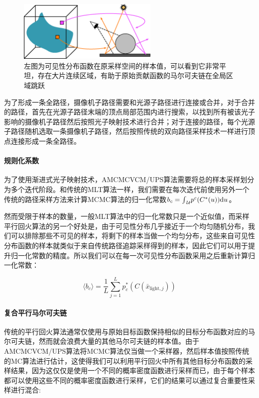 \begin{figure}
\sidecaption
\includegraphics[width=0.6\textwidth]{figures/mlt/visibility-contribution}
\caption{左图为可见性分布函数在原采样空间的样本值，可以看到它非常平坦，存在大片连续区域，有助于原始贡献函数的马尔可夫链在全局区域跳跃}
\label{f:mlt-visibility-contribution}
\end{figure}

为了形成一条全路径，摄像机子路径需要和光源子路径进行连接或合并，对于合并的路径，首先在光源子路径末端的顶点局部范围内进行搜索，以找到所有被该光子影响的摄像机子路径然后按照光子映射技术进行合并；对于连接的路径，每个光源子路径随机选取一条摄像机子路径，然后按照传统的双向路径采样技术一样进行顶点连接形成一条全路径。




\paragraph{规则化系数}
为了使用渐进式光子映射技术，AMCMCVCM/UPS算法需要将总的样本采样划分为多个迭代阶段。和传统的MLT算法一样，我们需要在每次迭代前使用另外一个传统的路径采样方法来计算MCMC算法的归一化常数$b_c={\rm \int}_{\mathcal{U}}p^{c}(C^{*}(u)){\rm d}u$。

然而受限于样本的数量，一般MLT算法中的归一化常数只是一个近似值，而采样平行回火算法的另一个好处是，由于可见性分布几乎接近于一个均匀随机分布，我们可以排除那些不可见的样本，将剩下的样本当做一个均匀分布，这些来自可见性分布函数的样本就类似于来自传统路径追踪采样得到的样本，因此它们可以用于提升归一化常数的精度。所以我们可以在每一次可见性分布函数采用之后重新计算归一化常数：

\begin{equation}
	\langle b_c\rangle=\frac{1}{L}\sum^{L}_{j=1}p^{*}_c(C(\bar{x}_{\text{light},j}))
\end{equation}




\paragraph{复合平行马尔可夫链}
传统的平行回火算法通常仅使用与原始目标函数保持相似的目标分布函数对应的马尔可夫链，然而就会浪费大量的其他马尔可夫链的样本值。由于AMCMCVCM/UPS算法将MCMC算法仅当做一个采样器，然后样本值按照传统的MC算法进行估计，这使得我们可以利用平行回火中所有其他目标分布函数的采样结果，因为这仅仅是使用一个不同的概率密度函数进行采样而已，由于每个样本都可以使用这些不同的概率密度函数进行采样，它们的结果可以通过复合重要性采样进行混合:

